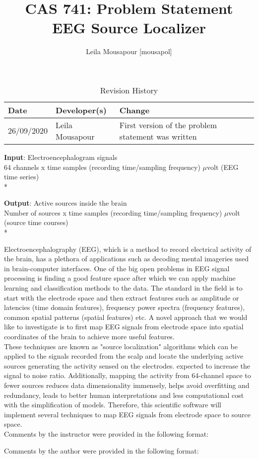\documentclass{article}
\title{CAS 741: Problem Statement\\EEG Source Localizer}
\author{Leila Mousapour [mousapol]}
\date{}
\begin{document}
\maketitle

\begin{table}[hp]
\caption{Revision History} \label{TblRevisionHistory}
\begin{tabularx}{\textwidth}{llX}
\toprule
\textbf{Date} & \textbf{Developer(s)} & \textbf{Change}\\
\midrule
26/09/2020 & Leila Mousapour & First version of the problem statement was written\\
\bottomrule
\end{tabularx}
\end{table}

\textbf{Input}: Electroencephalogram signals
\\
{\footnotesize 64 channels x time samples (recording time/sampling frequency) $\mu$volt (EEG time series)}
\\*

\textbf{Output}: Active sources inside the brain
\\
{\footnotesize Number of sources x time samples (recording time/sampling frequency)  $\mu$volt (source time courses)}
\\*

Electroencephalography (EEG), which is a method to record electrical activity of the brain, has a plethora of applications such as decoding mental imageries used in brain-computer interfaces. One of the big open problems in EEG signal processing is finding a good feature space after which we can apply machine learning and classification methods to the data. The standard in the field is to start with the electrode space and then extract features such as amplitude or latencies (time domain features), frequency power spectra (frequency features), common spatial patterns (spatial features) etc. A novel approach that we would like to investigate is to first map EEG signals from electrode space into spatial coordinates of the brain to achieve more useful features.
\\

These techniques are known as "source localization" algorithms which can be applied to the signals recorded from the scalp and locate the underlying active sources generating the activity sensed on the electrodes. expected to increase the signal to noise ratio. Additionally, mapping the activity from 64-channel space to fewer sources reduces data dimensionality immensely, helps avoid overfitting and redundancy, leads to better human interpretations and less computational cost with the simplification of models. Therefore, this scientific software will implement several techniques to map EEG signals from electrode space to source space.
\\

Comments by the instructor were provided in the following format:


Comments by the author were provided in the following format:

\end{document}
